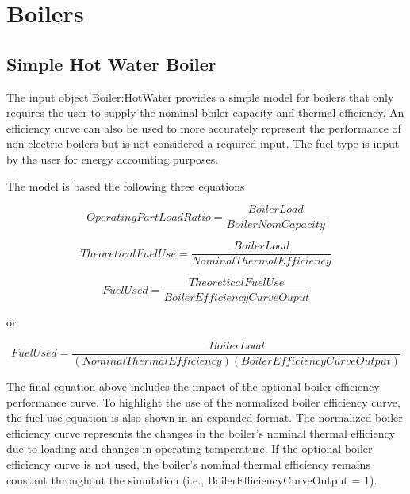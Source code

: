 \section{Boilers }\label{boilers}

\subsection{Simple Hot Water Boiler}\label{simple-hot-water-boiler}

The input object Boiler:HotWater provides a simple model for boilers that only requires the user to supply the nominal boiler capacity and thermal efficiency. An efficiency curve can also be used to more accurately represent the performance of non-electric boilers but is not considered a required input. The fuel type is input by the user for energy accounting purposes.

The model is based the following three equations

\begin{equation}
OperatingPartLoadRatio = \frac{{BoilerLoad}}{{BoilerNomCapacity}}
\end{equation}

\begin{equation}
TheoreticalFuelUse = \frac{{BoilerLoad}}{{NominalThermalEfficiency}}
\end{equation}

\begin{equation}
FuelUsed = \frac{{TheoreticalFuelUse}}{{BoilerEfficiencyCurveOuput}}
\end{equation}

or

\begin{equation}
FuelUsed = \frac{{BoilerLoad}}{{\left( {NominalThermalEfficiency} \right)\left( {BoilerEfficiencyCurveOutput} \right)}}
\end{equation}

The final equation above includes the impact of the optional boiler efficiency performance curve. To highlight the use of the normalized boiler efficiency curve, the fuel use equation is also shown in an expanded format. The normalized boiler efficiency curve represents the changes in the boiler's nominal thermal efficiency due to loading and changes in operating temperature. If the optional boiler efficiency curve is not used, the boiler's nominal thermal efficiency remains constant throughout the simulation (i.e., BoilerEfficiencyCurveOutput = 1).

